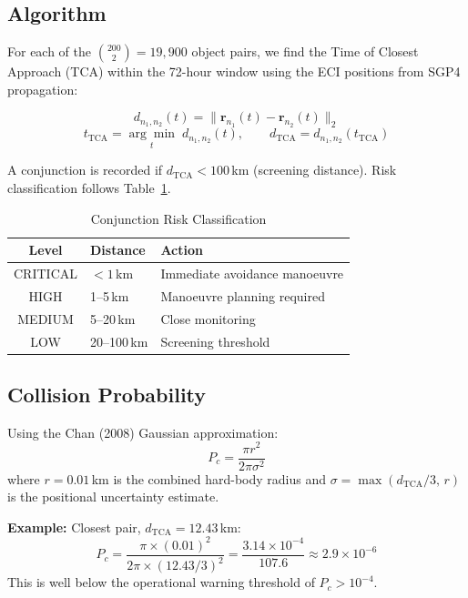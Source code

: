 \documentclass[conference]{IEEEtran}
\begin{document}
\subsection{Algorithm}

For each of the $\binom{200}{2} = 19{,}900$ object pairs, we find the
Time of Closest Approach (TCA) within the 72-hour window using the ECI
positions from SGP4 propagation:

\begin{equation}
d_{n_1,n_2}(t) = \|\mathbf{r}_{n_1}(t) - \mathbf{r}_{n_2}(t)\|_2
\label{eq:distance}
\end{equation}
\begin{equation}
t_\text{TCA} = \underset{t}{\arg\min}\; d_{n_1,n_2}(t), \qquad
d_\text{TCA} = d_{n_1,n_2}(t_\text{TCA})
\label{eq:tca}
\end{equation}

A conjunction is recorded if $d_\text{TCA} < 100$\,km (screening distance).
Risk classification follows Table~\ref{tab:risk}.

\begin{table}[H]
\centering
\caption{Conjunction Risk Classification}
\label{tab:risk}
\begin{tabular}{clp{3.5cm}}
\toprule
\textbf{Level} & \textbf{Distance} & \textbf{Action} \\
\midrule
CRITICAL & $< 1$\,km   & Immediate avoidance manoeuvre \\
HIGH     & 1--5\,km    & Manoeuvre planning required \\
MEDIUM   & 5--20\,km   & Close monitoring \\
LOW      & 20--100\,km & Screening threshold \\
\bottomrule
\end{tabular}
\end{table}

\subsection{Collision Probability}

Using the Chan (2008) \cite{chan2008} Gaussian approximation:
\begin{equation}
P_c = \frac{\pi r^2}{2\pi \sigma^2}
\label{eq:pc}
\end{equation}
where $r = 0.01$\,km is the combined hard-body radius and
$\sigma = \max(d_\text{TCA}/3,\, r)$ is the positional uncertainty estimate.

\textbf{Example:} Closest pair, $d_\text{TCA} = 12.43$\,km:
\begin{equation}
P_c = \frac{\pi \times (0.01)^2}{2\pi \times (12.43/3)^2}
    = \frac{3.14 \times 10^{-4}}{107.6} \approx 2.9 \times 10^{-6}
\end{equation}
This is well below the operational warning threshold of $P_c > 10^{-4}$.
\end{document}
